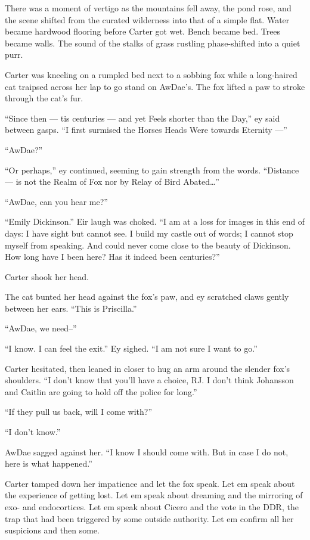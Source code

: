 There was a moment of vertigo as the mountains fell away, the pond rose, and the scene shifted from the curated wilderness into that of a simple flat. Water became hardwood flooring before Carter got wet. Bench became bed. Trees became walls. The sound of the stalks of grass rustling phase-shifted into a quiet purr.

Carter was kneeling on a rumpled bed next to a sobbing fox while a long-haired cat traipsed across her lap to go stand on AwDae's. The fox lifted a paw to stroke through the cat's fur.

``Since then — tis centuries — and yet Feels shorter than the Day,'' ey said between gasps. ``I first surmised the Horses Heads Were towards Eternity —''

``AwDae?''

``Or perhaps,'' ey continued, seeming to gain strength from the words. ``Distance — is not the Realm of Fox nor by Relay of Bird Abated\ldots{}''

``AwDae, can you hear me?''

``Emily Dickinson.'' Eir laugh was choked. ``I am at a loss for images in this end of days: I have sight but cannot see. I build my castle out of words; I cannot stop myself from speaking. And could never come close to the beauty of Dickinson. How long have I been here? Has it indeed been centuries?''

Carter shook her head.

The cat bunted her head against the fox's paw, and ey scratched claws gently between her ears. ``This is Priscilla.''

``AwDae, we need--''

``I know. I can feel the exit.'' Ey sighed. ``I am not sure I want to go.''

Carter hesitated, then leaned in closer to hug an arm around the slender fox's shoulders. ``I don't know that you'll have a choice, RJ. I don't think Johansson and Caitlin are going to hold off the police for long.''

``If they pull us back, will I come with?''

``I don't know.''

AwDae sagged against her. ``I know I should come with. But in case I do not, here is what happened.''

Carter tamped down her impatience and let the fox speak. Let em speak about the experience of getting lost. Let em speak about dreaming and the mirroring of exo- and endocortices. Let em speak about Cicero and the vote in the DDR, the trap that had been triggered by some outside authority. Let em confirm all her suspicions and then some.

